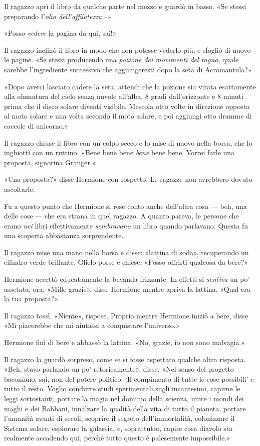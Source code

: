 Il ragazzo aprì il libro da qualche parte nel mezzo e guardò in basso. «Se stessi preparando l’\textit{olio dell’affilatezza} –»

«Posso \textit{vedere} la pagina da qui, sai!»

Il ragazzo inclinò il libro in modo che non potesse vederlo più, e sfogliò di nuovo le pagine. «Se stessi producendo una \textit{pozione dei movimenti del ragno}, quale sarebbe l’ingrediente successivo che aggiungeresti dopo la seta di Acromantula?»

«Dopo averci lasciato cadere la seta, attendi che la pozione sia virata esattamente alla sfumatura del cielo senza nuvole all’alba, 8 gradi dall’orizzonte e 8 minuti prima che il disco solare diventi visibile. Mescola otto volte in direzione opposta al moto solare e una volta secondo il moto solare, e poi aggiungi otto dramme di caccole di unicorno.»

Il ragazzo chiuse il libro con un colpo secco e lo mise di nuovo nella borsa, che lo inghiottì con un ruttino. «Bene bene bene \textit{bene} bene bene. Vorrei farle una proposta, signorina Granger.»

«Una proposta?» disse Hermione con sospetto. Le ragazze non avrebbero dovuto ascoltarle.

Fu a questo punto che Hermione si rese conto anche dell’altra cosa — beh, una delle cose — che era strana in quel ragazzo. A quanto pareva, le persone che erano \textit{nei} libri effettivamente \textit{sembravano} un libro quando parlavano. Questa fu una scoperta abbastanza sorprendente.

Il ragazzo mise una mano nella borsa e disse: «lattina di soda», recuperando un cilindro verde brillante. Glielo porse e chiese, «Posso offrirti qualcosa da bere?»

Hermione accettò educatamente la bevanda frizzante. In effetti si \textit{sentiva} un po’ assetata, ora. «Mille grazie», disse Hermione mentre apriva la lattina. «Qual era la tua proposta?»

Il ragazzo tossì. «Niente», rispose. Proprio mentre Hermione iniziò a bere, disse «Mi piacerebbe che mi aiutassi a conquistare l’universo.»

Hermione finì di bere e abbassò la lattina. «No, grazie, io non sono malvagia.»

Il ragazzo la guardò sorpreso, come se si fosse aspettato qualche altra risposta. «Beh, stavo parlando un po’ retoricamente», disse. «Nel senso del progetto baconiano, sai, non del potere politico. ‘Il compimento di tutte le cose possibili’ e tutto il resto. Voglio condurre studi sperimentali sugli incantesimi, capirne le leggi sottostanti, portare la magia nel dominio della scienza, unire i mondi dei maghi e dei Babbani, innalzare la qualità della vita di tutto il pianeta, portare l’umanità avanti di secoli, scoprire il segreto dell’immortalità, colonizzare il Sistema solare, esplorare la galassia, e, soprattutto, capire cosa diavolo sta realmente accadendo qui, perché tutto questo è palesemente impossibile.»

